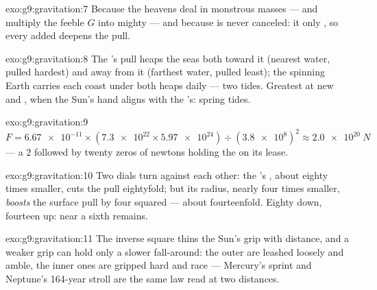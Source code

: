 \begin{solution}{exo:g9:gravitation:7}
Because the heavens deal in monstrous masses ---  and
 multiply the feeble $G$ into mighty  --- and
because  is never canceled: it only , so
every added  deepens the pull.
\end{solution}

\begin{solution}{exo:g9:gravitation:8}
The 's pull heaps the seas both toward it (nearest water,
pulled hardest) and away from it (farthest water, pulled
least); the spinning Earth carries each coast under both
heaps daily --- two tides. Greatest at new and ,
when the Sun's hand aligns with the 's: spring tides.
\end{solution}

\begin{solution}{exo:g9:gravitation:9}
$F = \num{6.67e-11} \times (\num{7.3e22} \times
\num{5.97e24}) \div (\num{3.8e8})^2 \approx \qty{2.0e20}{N}$
--- a $2$ followed by twenty zeros of newtons holding the
 on its lease.
\end{solution}

\begin{solution}{exo:g9:gravitation:10}
Two dials turn against each other: the 's , about
eighty times smaller, cuts the pull eightyfold; but its
radius, nearly four times smaller, \emph{boosts} the surface
pull by four squared --- about fourteenfold. Eighty down,
fourteen up: near a sixth remains.
\end{solution}

\begin{solution}{exo:g9:gravitation:11}
The inverse square thins the Sun's grip with distance, and a
weaker grip can hold only a slower fall-around: the outer
 are leashed loosely and amble, the inner ones are
gripped hard and race --- Mercury's sprint and Neptune's
164-year stroll are the same law read at two distances.
\end{solution}

